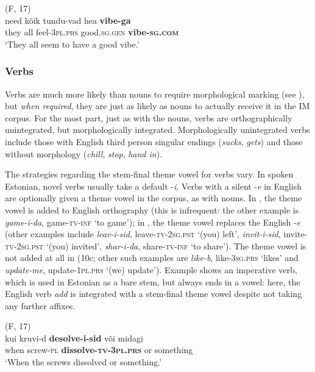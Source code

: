 \documentclass[output=paper]{langscibook}
\begin{document}
\ex   (F, 17)\\ \label{ex:vihmanetal:9b}
\gll need   kõik  tundu-vad  hea \textbf{{vibe-ga}}\\
they  all   feel{}-3\textsc{pl.prs}   good.\textsc{sg.gen}   \textbf{vibe{}-}\textbf{\textsc{sg.com}}\\
\glt ‘They all seem to have a good vibe.’
    \z
\z



\subsubsection{Verbs}

Verbs are much more likely than nouns to require morphological marking (see ), but \textit{when required}, they are just as likely as nouns to actually receive it in the IM corpus. For the most part, just as with the nouns, verbs are orthographically unintegrated, but morphologically integrated. Morphologically unintegrated verbs include those with English third person singular endings (\textit{sucks}, \textit{gets}) and those without morphology (\textit{chill}, \textit{stop}, \textit{hand in}).

The strategies regarding the stem-final theme vowel for verbs vary. In spoken Estonian, novel verbs usually take a default -\textit{i}. Verbs with a silent -\textit{e} in English are optionally given a theme vowel in the corpus, as with nouns. In , the theme vowel is added to English orthography (this is infrequent: the other example is \textit{game-i-da}, game{}-\textsc{tv-inf} ‘to game’); in , the theme vowel replaces the English -\textit{e} (other examples include \textit{leav-i-sid}, leave{}-\textsc{tv-2sg.pst} ‘(you) left’, \textit{invit-i-sid}, invite{}-\textsc{tv-2sg.pst} ‘(you) invited’, \textit{shar-i-da}, share{}-\textsc{tv-inf} ‘to share’). The theme vowel is not added at all in (10c; other such examples are \textit{like-b}, like{}-3\textsc{sg.prs} ‘likes’ and \textit{update-me}, update-1\textsc{pl.prs} ‘(we) update’). Example  shows an imperative verb, which is used in Estonian as a bare stem, but always ends in a vowel: here, the English verb \textit{add} is integrated with a stem-final theme vowel despite not taking any further affixes.

\ea%
    \label{ex:vihmanetal:10}
\ea  (F, 17)\\ \label{ex:vihmanetal:10a}
\gll kui  kruvi-d   \textbf{{desolve-i-sid}}    või midagi\\
when   screw{}-\textsc{pl}   \textbf{dissolve{}-\textsc{tv}-3}\textbf{\textsc{pl.prs}}   or something\\
\glt ‘When the screws dissolved or something.’
\end{document}
